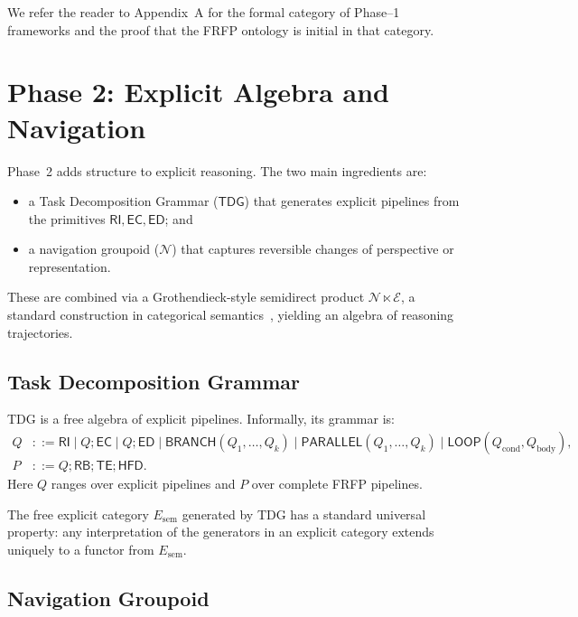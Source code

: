 \documentclass[11pt]{article}
\theoremstyle{definition}
\newcommand{\Ecat}{\mathcal{E}} %
\newcommand{\Ncat}{\mathcal{N}} %
\newcommand{\TDG}{\mathsf{TDG}} %
\newcommand{\RB}{\mathsf{RB}}   %
\newcommand{\RI}{\mathsf{RI}}
\newcommand{\EC}{\mathsf{EC}}
\newcommand{\ED}{\mathsf{ED}}
\newcommand{\TE}{\mathsf{TE}}
\newcommand{\HFD}{\mathsf{HFD}}
\newcommand{\BRANCH}{\mathsf{BRANCH}}
\newcommand{\PARALLEL}{\mathsf{PARALLEL}}
\newcommand{\LOOP}{\mathsf{LOOP}}
\begin{document}
We refer the reader to Appendix~A for the formal category of Phase--1
frameworks and the proof that the FRFP ontology is initial in that
category.

\section{Phase 2: Explicit Algebra and Navigation}
\label{sec:phase2}

Phase~2 adds structure to explicit reasoning. The two main ingredients
are:
\begin{itemize}[leftmargin=2em]
  \item a Task Decomposition Grammar (\(\TDG\)) that generates explicit
        pipelines from the primitives \(\RI,\EC,\ED\); and
  \item a navigation groupoid (\(\Ncat\)) that captures reversible
        changes of perspective or representation.
\end{itemize}
These are combined via a Grothendieck-style semidirect product
\(\Ncat \ltimes \Ecat\), a standard construction in categorical
semantics~\cite{MacLane1998,Awodey2010,Borceux1994}, yielding an algebra
of reasoning trajectories.


\subsection{Task Decomposition Grammar}

TDG is a free algebra of explicit pipelines. Informally, its grammar is:
\begin{align*}
Q &::= \RI \mid Q;\EC \mid Q;\ED \mid
        \BRANCH(Q_1,\dots,Q_k) \mid
        \PARALLEL(Q_1,\dots,Q_k) \mid
        \LOOP(Q_{\mathrm{cond}},Q_{\mathrm{body}}),\\
P &::= Q;\RB;\TE;\HFD.
\end{align*}
Here \(Q\) ranges over explicit pipelines and \(P\) over complete FRFP
pipelines.

The free explicit category \(E_{\mathrm{sem}}\) generated by TDG has a
standard universal property: any interpretation of the generators in an
explicit category extends uniquely to a functor from \(E_{\mathrm{sem}}\).

\subsection{Navigation Groupoid}
\end{document}
